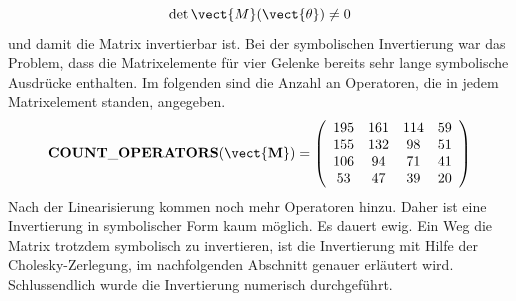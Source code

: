 \begin{equation*}
\det{\vect{M}(\vect{\theta})}\neq 0
\end{equation*}
und damit die Matrix invertierbar ist. Bei der symbolischen Invertierung war das Problem, dass die Matrixelemente für vier Gelenke bereits sehr lange symbolische Ausdrücke enthalten. Im folgenden sind die Anzahl an Operatoren, die in jedem Matrixelement standen, angegeben.
\begin{equation*}
\bf{COUNT\_OPERATORS(\vect{M})} = \left( \begin{array}{cccc}
195 & 161 & 114 & 59 \\
155 & 132 & 98 & 51 \\
106 & 94 & 71 & 41 \\
53 & 47 & 39 & 20 
\end{array} \right)
\end{equation*}
Nach der Linearisierung kommen noch mehr Operatoren hinzu. Daher ist eine Invertierung in symbolischer Form kaum möglich. Es dauert ewig. Ein Weg die Matrix trotzdem symbolisch zu invertieren, ist die Invertierung mit Hilfe der Cholesky-Zerlegung, im nachfolgenden Abschnitt genauer erläutert wird. \\
Schlussendlich wurde die Invertierung numerisch durchgeführt. 